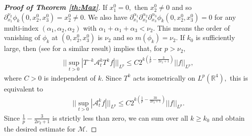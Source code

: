 \documentclass[a4paper, 11pt]{article}
\theoremstyle{plain}
\theoremstyle{definition}
\theoremstyle{lemma}
\theoremstyle{Remark}
\theoremstyle{proposition}
\theoremstyle{corollary}
\theoremstyle{example}
\theoremstyle{assumption}
\begin{document}
\begin{proof}[\textbf{Proof of Theorem \ref{th:Max}}]
If $x_1^0=0,$ then $x_2^0\neq 0$ and so  $\partial_{x_1}^{\nu_2}\phi_k(0, x_2^0, x_3^0)=x_2^0\neq 0.$ We also have $\partial_{x_1}^{\alpha_1}\partial_{x_2}^{\alpha_2}\partial_{x_3}^{\alpha_3}\phi_k(0, x_2^0, x_3^0)=0$ for any multi-index $(\alpha_1,\alpha_2,\alpha_2)$ with $\alpha_1+\alpha_1+\alpha_3<\nu_2.$ This means the order of vanishing of $\phi_k$ at $(0, x_2^0,x_3^0)$ is $\nu_2$ and so  $m(\phi_k)=\nu_2.$
If $k_0$ is sufficiently large,  then \cite[Theorem 7.1]{I.U} (see \cite[Proposition 4.5]{I.K.M} for a similar result) implies that, for $p>\nu_2,$
\begin{eqnarray*}
\big|\big|\sup_{t>0}|T^{-k} \mathcal{A}_t^k T^kf|\big|\big|_{L^p}\leq C 2^{k\left(\frac{1}{ p}-\frac{3}{2\nu_2+1}\right)}||f||_{L^p},
\end{eqnarray*}
 where $C>0$ is independent of $k$. Since $T^k$ acts isometrically on $L^p(\mathbb{R}^4),$ this is equivalent to
\begin{eqnarray*}
\big|\big|\sup_{t>0}| \mathcal{A}_t^k f|\big|\big|_{L^p}\leq C 2^{k\left(\frac{1}{ p}-\frac{3k}{2\nu_2+1}\right)}||f||_{L^p}.
\end{eqnarray*}
Since $\frac{1}{ p}-\frac{3}{2\nu_2+1}$ is strictly less than zero, we can sum over all $k\geq k_0$ and obtain the desired estimate for $\mathcal{M}.$




 \end{proof}

\bigskip
\end{document}
